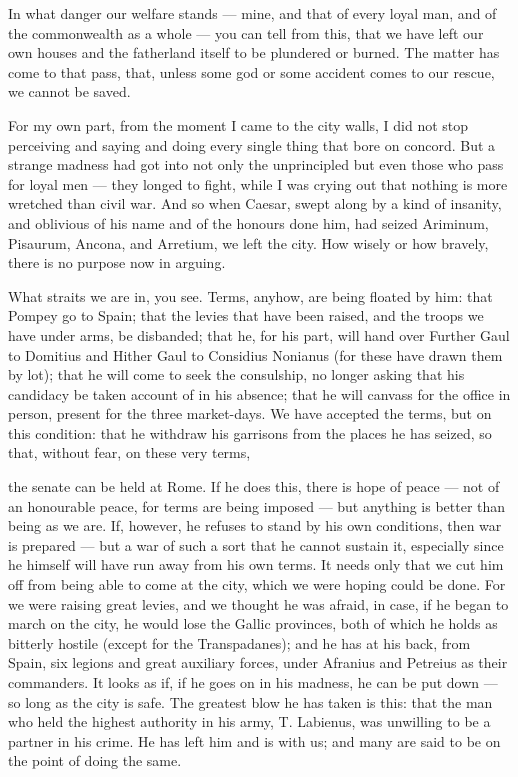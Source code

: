 

 In what danger our welfare stands --- mine, and that of every loyal man, and of the commonwealth as a whole --- you can tell from this, that we have left our own houses and the fatherland itself to be plundered or burned. The matter has come to that pass, that, unless some god or some accident comes to our rescue, we cannot be saved.

 For my own part, from the moment I came to the city walls, I did not stop perceiving and saying and doing every single thing that bore on concord. But a strange madness had got into not only the unprincipled but even those who pass for loyal men --- they longed to fight, while I was crying out that nothing is more wretched than civil war. And so when Caesar, swept along by a kind of insanity, and oblivious of his name and of the honours done him, had seized Ariminum, Pisaurum, Ancona, and Arretium, we left the city. How wisely or how bravely, there is no purpose now in arguing.

 What straits we are in, you see. Terms, anyhow, are being floated by him: that Pompey go to Spain; that the levies that have been raised, and the troops we have under arms, be disbanded; that he, for his part, will hand over Further Gaul to Domitius and Hither Gaul to Considius Nonianus (for these have drawn them by lot); that he will come to seek the consulship, no longer asking that his candidacy be taken account of in his absence; that he will canvass for the office in person, present for the three market-days. We have accepted the terms, but on this condition: that he withdraw his garrisons from the places he has seized, so that, without fear, on these very terms,

 the senate can be held at Rome. If he does this, there is hope of peace --- not of an honourable peace, for terms are being imposed --- but anything is better than being as we are. If, however, he refuses to stand by his own conditions, then war is prepared --- but a war of such a sort that he cannot sustain it, especially since he himself will have run away from his own terms. It needs only that we cut him off from being able to come at the city, which we were hoping could be done. For we were raising great levies, and we thought he was afraid, in case, if he began to march on the city, he would lose the Gallic provinces, both of which he holds as bitterly hostile (except for the Transpadanes); and he has at his back, from Spain, six legions and great auxiliary forces, under Afranius and Petreius as their commanders. It looks as if, if he goes on in his madness, he can be put down --- so long as the city is safe. The greatest blow he has taken is this: that the man who held the highest authority in his army, T. Labienus, was unwilling to be a partner in his crime. He has left him and is with us; and many are said to be on the point of doing the same.

